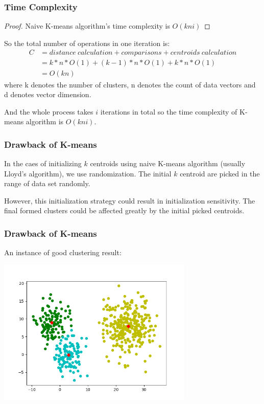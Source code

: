 \documentclass[9pt]{beamer}
\newcommand{\ccb}[1]{{\color{blue}#1}}
\newcommand{\ccp}[1]{{\color{purple}#1}}
\begin{document}
\begin{frame}
	\frametitle{Time Complexity}
	\begin{proof}
		Naive K-means algorithm's time complexity is \ccb{$O(kni)$}
	\end{proof}
	\par So the total number of operations in one iteration is:
	\begin{equation*}
		\begin{split}
			C &=  distance\ calculation + comparisons + centroids\ calculation\\
			& = k * n * O(1) + (k-1) * n * O(1) + k * n * O(1) \\
			& = O(kn)
		\end{split}
	\end{equation*}
	where k denotes the number of clusters, n denotes the count of data vectors and d denotes vector dimension.
	\par And the whole process takes $i$ iterations in total so the time complexity of K-means algorithm is \ccb{$O(kni)$}.
\end{frame}

\begin{frame}
	\frametitle{Drawback of K-means}
	In the caes of initializing $k$ centroids using naive K-means algorithm (usually Lloyd's algorithm), we use \ccp{randomization}.
  The initial $k$ centroid are picked in the range of data set randomly. 
	\par However, this initialization strategy could result in initialization sensitivity. The final formed clusters could be affected greatly by the initial picked centroids.	

\end{frame}

\begin{frame}
	\frametitle{Drawback of K-means}
	An instance of good clustering result:
	\centerline{\includegraphics[width=0.7\textwidth]{figures/fig2.png}}

\end{frame}
\end{document}
